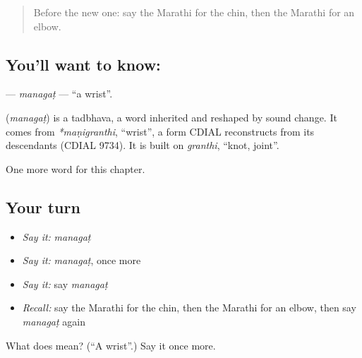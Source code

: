 \label{lesson:MR-C145-managat}



\begin{quote}
Before the new one: say the Marathi for the chin, then the Marathi for an elbow.
\end{quote}

\subsection*{You'll want to know: }
\textbf{} — \emph{managaṭ} — \textquotedblleft{}a wrist\textquotedblright{}.

\begin{cousinweb}
\textbf{} (\emph{managaṭ}) is a tadbhava, a word inherited and reshaped by sound change. It comes from \emph{*maṇigranthi}, \textquotedblleft{}wrist\textquotedblright{}, a form CDIAL reconstructs from its descendants (CDIAL 9734). It is built on \emph{granthi}, \textquotedblleft{}knot, joint\textquotedblright{}.
\end{cousinweb}

\begin{grammarlens}[title={What you've built}]
One more word for this chapter.
\end{grammarlens}

\subsection*{Your turn}
\begin{itemize}
\raggedright
  \item \emph{Say it:} \emph{managaṭ}
  \item \emph{Say it:} \emph{managaṭ}, once more
  \item \emph{Say it:} say \emph{managaṭ}
  \item \emph{Recall:} say the Marathi for the chin, then the Marathi for an elbow, then say \emph{managaṭ} again
\end{itemize}

\begin{tcolorbox}[breakable,colback=teal!4,colframe=teal!35!black,title={Before you move on}]
What does  mean? (\textquotedblleft{}A wrist\textquotedblright{}.) Say it once more.
\end{tcolorbox}

